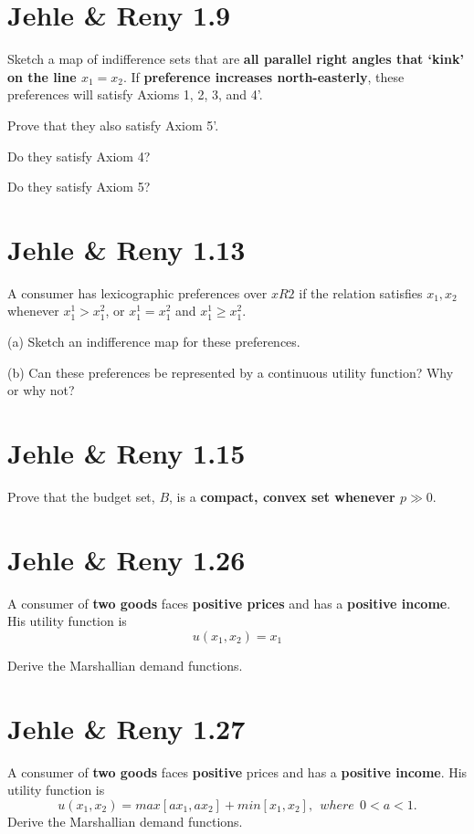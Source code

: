 \documentclass{article}
\begin{document}

\section{Jehle \& Reny 1.9}

Sketch a map of indifference sets that are \textbf{all parallel right angles that ‘kink’ on the line $x_1 = x_2$}. If
\textbf{preference increases north-easterly}, these preferences will satisfy Axioms 1, 2, 3, and 4'. 

Prove that they also satisfy Axiom 5'. 

Do they satisfy Axiom 4? 

Do they satisfy Axiom 5?

\section{Jehle \& Reny 1.13}
A consumer has lexicographic preferences over $x R2$ if the relation  satisfies $x_1, x_2$ whenever
$x_1^1 > x_1^2$, or $x_1^1 = x_1^2$ and $x_1^1 \ge x_1^2$.

(a) Sketch an indifference map for these preferences.

(b) Can these preferences be represented by a continuous utility function? Why or why not?


\section{Jehle \& Reny 1.15}
Prove that the budget set, $B$, is a \textbf{compact, convex set whenever $p \gg 0$}.


\section{Jehle \& Reny 1.26}
A consumer of \textbf{two goods} faces \textbf{positive prices} and has a \textbf{positive income}. 
His utility function is $$u(x_1, x_2) = x_1$$ 

Derive the Marshallian demand functions.


\section{Jehle \& Reny 1.27}
A consumer of \textbf{two goods} faces \textbf{positive} prices and has a \textbf{positive income}. 
His utility function is $$u(x_1, x_2) = max[ax_1, ax_2] + min[x_1, x_2], \ \ where \ \ 0 < a < 1.$$
Derive the Marshallian demand functions.
\end{document}
